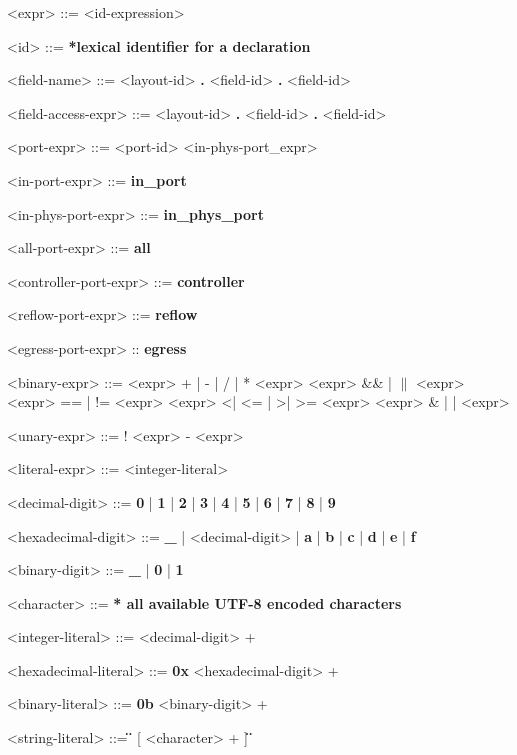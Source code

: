 \begin{mdframed}
\begin{grammar}

<expr> ::=
<id-expression>


<id> ::= \textbf{*lexical identifier for a declaration}

<field-name> ::=
<layout-id> \textbf{.} <field-id>
 \textbf{.} <field-id>

<field-access-expr> ::=
<layout-id> \textbf{.} <field-id>
 \textbf{.} <field-id>

<port-expr> ::=
<port-id>
\alt <in-phys-port_expr>

<in-port-expr> ::= \textbf{in\_port}

<in-phys-port-expr> ::=  \textbf{in\_phys\_port}

<all-port-expr> ::= \textbf{all}

<controller-port-expr> ::= \textbf{controller}

<reflow-port-expr> ::= \textbf{reflow}

<egress-port-expr> :: \textbf{egress}

<binary-expr> ::= <expr>  + | - | / | *  <expr>
\alt <expr>  \&\& | $\|$  <expr>
\alt <expr> == | != <expr>
\alt <expr>  \textless | \textless= | \textgreater | \textgreater=  <expr>
\alt <expr>  \& | \string | \textbar  <expr>

<unary-expr> ::= 
! <expr>
\alt - <expr>

<literal-expr> ::=
<integer-literal>

<decimal-digit> ::= \textbf{0} | \textbf{1} | \textbf{2} | \textbf{3} | \textbf{4} | \textbf{5} | \textbf{6} | \textbf{7} | \textbf{8} | \textbf{9}

<hexadecimal-digit> ::= \textbf{\_} | <decimal-digit> | \textbf{a} | \textbf{b} | \textbf{c} | \textbf{d} | \textbf{e} | \textbf{f}             

<binary-digit> ::= \textbf{\_} | \textbf{0} | \textbf{1}

<character> ::= \textbf{* all available UTF-8 encoded characters}

<integer-literal> ::=
<decimal-digit> +

<hexadecimal-literal> ::=
\textbf{0x} <hexadecimal-digit> +

<binary-literal> ::=
\textbf{0b} <binary-digit> +

<string-literal> ::=
\textbf{\"} [ <character> + ] \textbf{\"} 

\end{grammar}
\end{mdframed}

